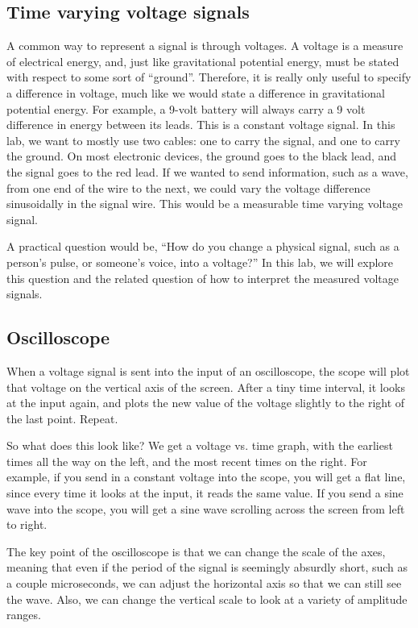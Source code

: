 \subsection{Time varying voltage signals}
A common way to represent a signal is through voltages. A voltage is a measure of electrical energy, and, just like gravitational potential energy, must be stated with respect to some sort of ``ground''. Therefore, it is really only useful to specify a difference in voltage, much like we would state a difference in gravitational potential energy. For example, a 9-volt battery will always carry a 9 volt difference in energy between its leads. This is a constant voltage signal. In this lab, we want to mostly use two cables: one to carry the signal, and one to carry the ground. On most electronic devices, the ground goes to the black lead, and the signal goes to the red lead. If we wanted to send information, such as a wave, from one end of the wire to the next, we could vary the voltage difference sinusoidally in the signal wire. This would be a measurable time varying voltage signal.\myskip

A practical question would be, ``How do you change a physical signal, such as a person's pulse, or someone's voice, into a voltage?'' In this lab, we will explore this question and the related question of how to interpret the measured voltage signals.


\subsection{Oscilloscope}
When a voltage signal is sent into the input of an oscilloscope, the scope will plot that voltage on the vertical axis of the screen. After a tiny time interval, it looks at the input again, and plots the new value of the voltage slightly to the right of the last point. Repeat.\myskip

So what does this look like? We get a voltage vs. time graph, with the earliest times all the way on the left, and the most recent times on the right. For example, if you send in a constant voltage into the scope, you will get a flat line, since every time it looks at the input, it reads the same value. If you send a sine wave into the scope, you will get a sine wave scrolling across the screen from left to right.\myskip

The key point of the oscilloscope is that we can change the scale of the axes, meaning that even if the period of the signal is seemingly absurdly short, such as a couple microseconds, we can adjust the horizontal axis so that we can still see the wave. Also, we can change the vertical scale to look at a variety of amplitude ranges.\myskip

